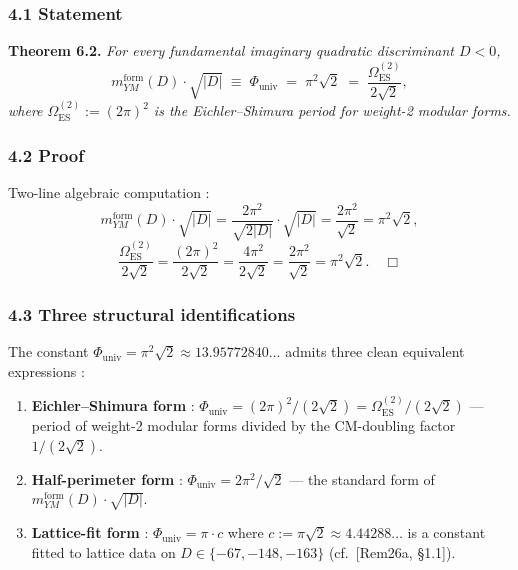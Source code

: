 \documentclass[
  11pt,
  a4paper,
]{amsart}
\begin{document}
\hypertarget{statement-1}{%
\subsubsection{4.1 Statement}\label{statement-1}}

\textbf{Theorem 6.2.} \emph{For every fundamental imaginary quadratic discriminant \(D < 0\),}
\[
m_{YM}^{\mathrm{form}}(D)\cdot\sqrt{|D|} \;\equiv\; \Phi_{\mathrm{univ}} \;=\; \pi^{2}\sqrt 2 \;=\; \frac{\Omega_{\mathrm{ES}}^{(2)}}{2\sqrt 2},
\]
\emph{where \(\Omega_{\mathrm{ES}}^{(2)} := (2\pi)^{2}\) is the Eichler--Shimura period for weight-2 modular forms.}

\hypertarget{proof-1}{%
\subsubsection{4.2 Proof}\label{proof-1}}

Two-line algebraic computation :
\[
m_{YM}^{\mathrm{form}}(D)\cdot\sqrt{|D|} = \frac{2\pi^{2}}{\sqrt{2|D|}}\cdot\sqrt{|D|} = \frac{2\pi^{2}}{\sqrt 2} = \pi^{2}\sqrt 2,
\]
\[
\frac{\Omega_{\mathrm{ES}}^{(2)}}{2\sqrt 2} = \frac{(2\pi)^{2}}{2\sqrt 2} = \frac{4\pi^{2}}{2\sqrt 2} = \frac{2\pi^{2}}{\sqrt 2} = \pi^{2}\sqrt 2. \quad\Box
\]

\hypertarget{three-structural-identifications}{%
\subsubsection{4.3 Three structural identifications}\label{three-structural-identifications}}

The constant \(\Phi_{\mathrm{univ}} = \pi^{2}\sqrt 2 \approx 13.95772840\ldots\) admits three clean equivalent expressions :

\begin{enumerate}
\def\labelenumi{(\Alph{enumi})}
\item
  \textbf{Eichler--Shimura form} : \(\Phi_{\mathrm{univ}} = (2\pi)^{2}/(2\sqrt 2) = \Omega_{\mathrm{ES}}^{(2)}/(2\sqrt 2)\) --- period of weight-2 modular forms divided by the CM-doubling factor \(1/(2\sqrt 2)\).
\item
  \textbf{Half-perimeter form} : \(\Phi_{\mathrm{univ}} = 2\pi^{2}/\sqrt 2\) --- the standard form of \(m_{YM}^{\mathrm{form}}(D)\cdot \sqrt{|D|}\).
\item
  \textbf{Lattice-fit form} : \(\Phi_{\mathrm{univ}} = \pi\cdot c\) where \(c := \pi\sqrt 2 \approx 4.44288\ldots\) is a constant fitted to lattice data on \(D\in\{-67,-148,-163\}\) (cf.~{[}Rem26a, §1.1{]}).
\end{enumerate}
\end{document}
